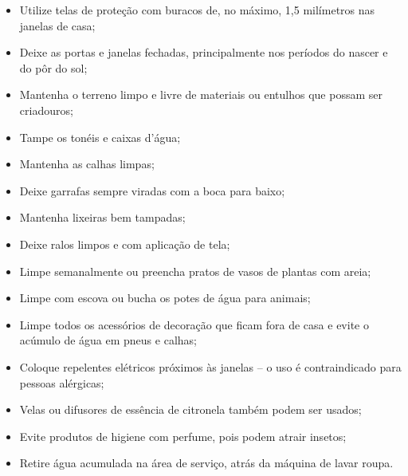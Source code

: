 \begin{itemize}
  
  \item Utilize telas de proteção com buracos de, no máximo, 1,5 milímetros nas
janelas de casa;
  
  \item Deixe as portas e janelas fechadas, principalmente nos períodos do nascer e do pôr do sol;
  
  \item Mantenha o terreno limpo e livre de materiais ou entulhos que possam ser criadouros;
  
  \item Tampe os tonéis e caixas d'água;
  
  \item Mantenha as calhas limpas;
  
  \item Deixe garrafas sempre viradas com a boca para baixo;
  
  \item Mantenha lixeiras bem tampadas;
  
  \item Deixe ralos limpos e com aplicação de tela;
  
  \item Limpe semanalmente ou preencha pratos de vasos de plantas com areia;
  
  \item Limpe com escova ou bucha os potes de água para animais;
  
  \item Limpe todos os acessórios de decoração que ficam fora de casa e evite o acúmulo de água em pneus e calhas;
  
  \item Coloque repelentes elétricos próximos às janelas -- o uso é contraindicado para pessoas alérgicas;
  
  \item Velas ou difusores de essência de citronela também podem ser usados;
  
  \item Evite produtos de higiene com perfume, pois podem atrair insetos;
  
  \item Retire água acumulada na área de serviço, atrás da máquina de lavar
  roupa.
 
\end{itemize}


